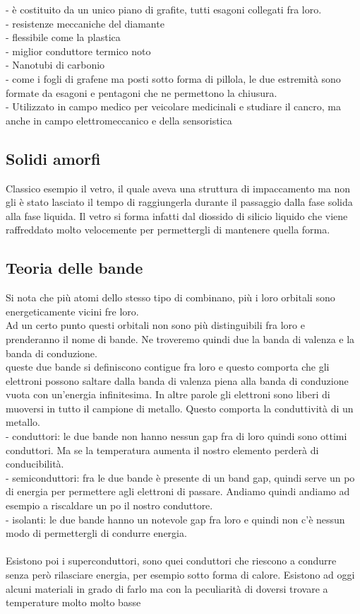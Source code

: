 \tab\tab- è costituito da un unico piano di grafite, tutti esagoni collegati fra loro. \\
\tab\tab- resistenze meccaniche del diamante\\
\tab\tab- flessibile come la plastica \\
\tab\tab- miglior conduttore termico noto\\
\tab- Nanotubi di carbonio\\
\tab\tab- come i fogli di grafene ma posti sotto forma di pillola, le due estremità sono formate da esagoni e pentagoni che ne permettono la chiusura.\\
\tab\tab- Utilizzato in campo medico per veicolare medicinali e studiare il cancro, ma anche in campo elettromeccanico e della sensoristica
\subsection{Solidi amorfi}
Classico esempio il vetro, il quale aveva una struttura di impaccamento ma non gli è stato lasciato il tempo di raggiungerla durante il passaggio dalla fase solida alla fase liquida. Il vetro si forma infatti dal diossido di silicio liquido che viene raffreddato molto velocemente per permettergli di mantenere quella forma.
\subsection{Teoria delle bande}
Si nota che più atomi dello stesso tipo di combinano, più i loro orbitali sono energeticamente vicini fre loro. \\
Ad un certo punto questi orbitali non sono più distinguibili fra loro e prenderanno il nome di bande. Ne troveremo quindi due la banda di valenza e la banda di conduzione. \\
queste due bande si definiscono contigue fra loro e questo comporta che gli elettroni possono saltare dalla banda di valenza piena alla banda di conduzione vuota con un’energia infinitesima. In altre parole gli elettroni sono liberi di muoversi in tutto il campione di metallo. Questo comporta la conduttività di un metallo. \\
\tab- conduttori: le due bande non hanno nessun gap fra di loro quindi sono ottimi conduttori. Ma se la temperatura aumenta il nostro elemento perderà di conducibilità.\\
\tab- semiconduttori: fra le due bande è presente di un band gap, quindi serve un po di energia per permettere agli elettroni di passare. Andiamo quindi andiamo ad esempio a riscaldare un po il nostro conduttore. \\
\tab- isolanti: le due bande hanno un notevole gap fra loro e quindi non c’è nessun modo di permettergli di condurre energia.\\\\
Esistono poi i superconduttori, sono quei conduttori che riescono a condurre senza però rilasciare energia, per esempio sotto forma di calore. Esistono ad oggi alcuni materiali in grado di farlo ma con la peculiarità di doversi trovare a temperature molto molto basse
